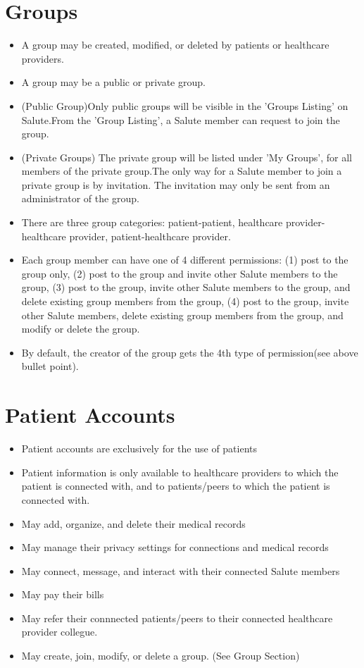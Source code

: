 \documentclass[10pt]{report}
\begin{document}
\section{Groups}
\begin{itemize}
\item A group may be created, modified, or deleted by patients or healthcare providers.
\item A group may be a public or private group. 
\item (Public Group)Only public groups will be visible in the 'Groups Listing' on Salute.From the 'Group Listing', a Salute member can request to join the group.
\item (Private Groups) The private group will be listed under 'My Groups', for all members of the private group.The only way for a Salute member to join a private group is by invitation. The invitation may only be sent from an administrator of the group.
\item There are three group categories: patient-patient, healthcare provider-healthcare provider, patient-healthcare provider.
\item Each group member can have one of 4 different permissions: (1) post to the group only, (2) post to the group and invite other Salute members to the group, (3) post to the group, invite other Salute members to the group, and delete existing group members from the group, (4) post to the group, invite other Salute members, delete existing group members from the group, and modify or delete the group.
\item By default, the creator of the group gets the 4th type of permission(see above bullet point). 
\end{itemize} 

\section{Patient Accounts}
\begin{itemize}
\item Patient accounts are exclusively for the use of patients
\item Patient information is only available to healthcare providers to which the patient is connected with, and to patients/peers to which the patient is connected with.
\item May add, organize, and delete their medical records
\item May manage their privacy settings for connections and medical records
\item May connect, message, and interact with their connected Salute members
\item May pay their bills 
\item May refer their connnected patients/peers to their connected healthcare provider collegue.
\item May create, join, modify, or delete a group. (See Group Section)
\end{itemize}
\end{document}
